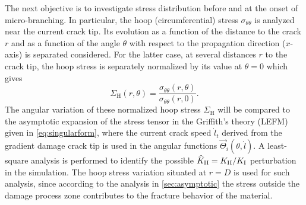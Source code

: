 The next objective is to investigate stress distribution before and at the onset of micro-branching. In particular, the hoop (circumferential) stress $\sigma_{\theta\theta}$ is analyzed near the current crack tip. Its evolution as a function of the distance to the crack $r$ and as a function of the angle $\theta$ with respect to the propagation direction ($x$-axis) is separated considered. For the latter case, at several distances $r$ to the crack tip, the hoop stress is separately normalized by its value at $\theta=0$ which gives
\[
\Sigma_\mathrm{H}(r,\theta)=\frac{\sigma_{\theta\theta}(r,\theta)}{\sigma_{\theta\theta}(r,0)}.
\]
The angular variation of these normalized hoop stress $\Sigma_\mathrm{H}$ will be compared to the asymptotic expansion of the stress tensor in the Griffith's theory (LEFM) given in \eqref{eq:singularform}, where the current crack speed $\dot{l}_t$ derived from the gradient damage crack tip is used in the angular functions $\vec{\Theta}_i(\theta,\dot{l})$. A least-square analysis is performed to identify the possible $\widehat{K}_\RN{2}=K_\RN{2}/K_\RN{1}$ perturbation in the simulation. The hoop stress variation situated at $r=D$ is used for such analysis, since according to the analysis in \cref{sec:asymptotic} the stress outside the damage process zone contributes to the fracture behavior of the material.

